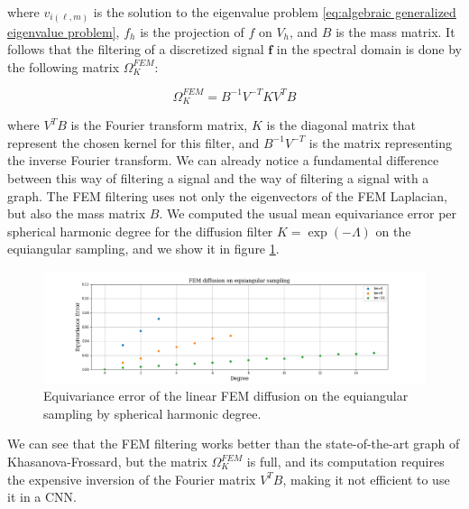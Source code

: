 where $v_{i(\ell, m)}$ is the solution to the eigenvalue problem \ref{eq:algebraic generalized eigenvalue problem}, $f_h$ is the projection of $f$ on $V_h$, and $B$ is the mass matrix. It follows that the filtering of a discretized signal $\mathbf f$ in the spectral domain is done by the following matrix  $\Omega_K^{FEM}$:

\begin{equation}\label{eq:FEM filtering}
	 \Omega_K^{FEM} = B^{-1}V^{-T}KV^TB
\end{equation}

where $V^TB$ is the Fourier transform matrix, $K$ is the diagonal matrix that represent the chosen kernel for this filter, and $B^{-1}V^{-T}$ is the matrix representing the inverse Fourier transform. We can already notice a fundamental difference between this way of filtering a signal and the way of filtering a signal with a graph. The FEM filtering uses not only the eigenvectors of the FEM Laplacian, but also the mass matrix $B$. We computed the usual mean equivariance error per spherical harmonic degree for the diffusion filter $K=\exp(-\Lambda)$ on the equiangular sampling, and we show it in figure \ref{fig:FEM diffusion}.
\begin{figure}[h]
	\centering
	\includegraphics[width=\textwidth]{../codes/06.Equivariance_error/FEMdiffusiononequiangularsampling.png}
	\caption{\label{fig:FEM diffusion}Equivariance error of the linear FEM diffusion on the equiangular sampling by spherical harmonic degree.}
\end{figure}
We can see that the FEM filtering works better than the state-of-the-art graph of Khasanova-Frossard, but the matrix $\Omega_K^{FEM}$ is full, and its computation requires the expensive inversion of the Fourier matrix $V^TB$, making it not efficient to use it in a CNN. 
